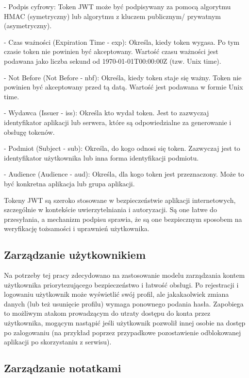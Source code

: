 \documentclass[a4paper,twoside,12pt]{book}
\begin{document}
- Podpis cyfrowy:
    Token JWT może być podpisywany za pomocą algorytmu HMAC (symetryczny) lub algorytmu z kluczem publicznym/ prywatnym (asymetryczny). 

- Czas ważności (Expiration Time - exp):
    Określa, kiedy token wygasa. Po tym czasie token nie powinien być akceptowany. Wartość czasu ważności jest podawana jako liczba sekund od 1970-01-01T00:00:00Z (tzw. Unix time).

- Not Before (Not Before - nbf):
    Określa, kiedy token staje się ważny. Token nie powinien być akceptowany przed tą datą. Wartość jest podawana w formie Unix time.

- Wydawca (Issuer - iss):
    Określa kto wydał token. Jest to zazwyczaj identyfikator aplikacji lub serwera, które są odpowiedzialne za generowanie i obsługę tokenów.

- Podmiot (Subject - sub):
    Określa, do kogo odnosi się token. Zazwyczaj jest to identyfikator użytkownika lub inna forma identyfikacji podmiotu.

- Audience (Audience - aud):
    Określa, dla kogo token jest przeznaczony. Może to być konkretna aplikacja lub grupa aplikacji.

Tokeny JWT są szeroko stosowane w bezpieczeństwie aplikacji internetowych,
szczególnie w kontekście uwierzytelniania i autoryzacji. Są one łatwe
do przesyłania, a mechanizm podpisu sprawia, że są one bezpiecznym
sposobem na weryfikację tożsamości i uprawnień użytkownika.

\subsection{Zarządzanie użytkownikiem}

Na potrzeby tej pracy zdecydowano na zastosowanie modelu zarządzania 
kontem użytkownika priorytezującego bezpieczeństwo i łatwość obsługi.
Po rejestracji i logowaniu użytkownik może wyświetlić swój profil,
ale jakakaolwiek zmiana danych (lub też usunięcie profilu) wymaga
ponownego podania hasła. Zapobiega to możliwym atakom
prowadzącym do utraty dostępu do konta przez użytkownika, mogącym nastąpić
jeśli użytkownik pozwolił innej osobie na dostęp po zalogowaniu (na przykład
poprzez przypadkowe pozostawienie odblokowanej aplikacji po skorzystaniu z serwisu).

\subsection{Zarządzanie notatkami}
\end{document}
